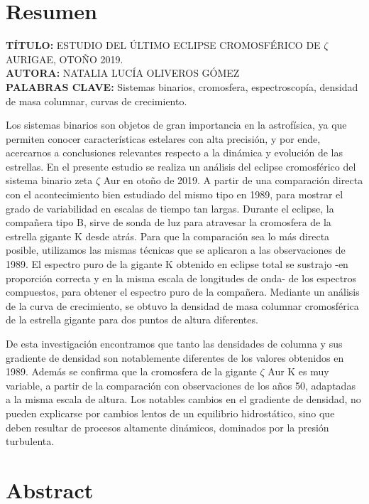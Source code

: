 \documentclass[12pt,oneside,openany,letter]{book}
\begin{document}
\chapter*{Resumen}
{\footnotesize \textbf{T\'ITULO:} ESTUDIO DEL ÚLTIMO ECLIPSE CROMOSFÉRICO DE $\zeta$ AURIGAE, OTOÑO 2019.\\
\textbf{AUTORA:} NATALIA LUCÍA OLIVEROS GÓMEZ\\
\textbf{PALABRAS CLAVE:} Sistemas binarios, cromosfera, espectroscopía, densidad de masa columnar, curvas de crecimiento.
\vspace{2mm}

Los sistemas binarios son objetos de gran importancia en la astrofísica, ya que permiten conocer características estelares con alta precisión, y por ende, acercarnos a conclusiones relevantes respecto a la dinámica y evolución de las estrellas. En el presente estudio se realiza un análisis del eclipse cromosférico del sistema binario zeta $\zeta$ Aur en otoño de 2019. A partir de una comparación directa con el acontecimiento bien estudiado del mismo tipo en 1989, para mostrar el grado de variabilidad en escalas de tiempo tan largas. Durante el eclipse, la compañera tipo B, sirve de sonda de luz para atravesar la cromosfera de la estrella gigante K desde atrás. Para que la comparación sea lo más directa posible, utilizamos las mismas técnicas que se aplicaron a las observaciones de 1989. El espectro puro de la gigante K obtenido en eclipse total se sustrajo -en proporción correcta y en la misma escala de longitudes de onda- de los espectros compuestos, para obtener el espectro puro de la compañera. Mediante un análisis de la curva de crecimiento, se obtuvo la densidad de masa columnar cromosférica de la estrella gigante para dos puntos de altura diferentes.


De esta investigación encontramos que tanto las densidades de columna y sus gradiente de densidad son notablemente diferentes de los valores obtenidos en 1989. Además se confirma que la cromosfera de la gigante $\zeta$ Aur K es muy variable, a partir de la comparación con observaciones de los años 50, adaptadas a la misma escala de altura. Los notables cambios en el gradiente de densidad, no pueden explicarse por cambios lentos de un equilibrio hidrostático, sino que deben resultar de procesos altamente dinámicos, dominados por la presión turbulenta.

}

\chapter*{Abstract}
\end{document}
